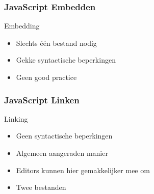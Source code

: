 \documentclass{../khlslides}
\newcommand{\jscodeblock}[3][]{\begin{block}{#3}\end{block}}
\begin{document}
\begin{frame}
  \frametitle{JavaScript Embedden}
  \jscodeblock{embed.html}{Embedding}
  \begin{itemize}
    \item Slechts \'e\'en bestand nodig
    \item Gekke syntactische beperkingen
    \item Geen good practice
  \end{itemize}
\end{frame}

\begin{frame}
  \frametitle{JavaScript Linken}
  \jscodeblock{linking.html}{Linking}
  \begin{itemize}
    \item Geen syntactische beperkingen
    \item Algemeen aangeraden manier
    \item Editors kunnen hier gemakkelijker mee om
    \item Twee bestanden
  \end{itemize}
\end{frame}
\end{document}
